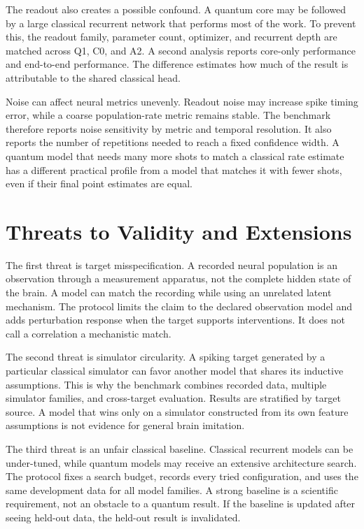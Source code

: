 \documentclass[conference]{IEEEtran}
\begin{document}
The readout also creates a possible confound. A quantum core may be followed by a large
classical recurrent network that performs most of the work. To prevent this, the readout
family, parameter count, optimizer, and recurrent depth are matched across Q1, C0, and
A2. A second analysis reports core-only performance and end-to-end performance. The
difference estimates how much of the result is attributable to the shared classical
head.

Noise can affect neural metrics unevenly. Readout noise may increase spike timing error,
while a coarse population-rate metric remains stable. The benchmark therefore reports
noise sensitivity by metric and temporal resolution. It also reports the number of
repetitions needed to reach a fixed confidence width. A quantum model that needs many
more shots to match a classical rate estimate has a different practical profile from a
model that matches it with fewer shots, even if their final point estimates are equal.

\section{Threats to Validity and Extensions}
\label{sec:threats}

The first threat is target misspecification. A recorded neural population is an
observation through a measurement apparatus, not the complete hidden state of the brain.
A model can match the recording while using an unrelated latent mechanism. The protocol
limits the claim to the declared observation model and adds perturbation response when
the target supports interventions. It does not call a correlation a mechanistic match.

The second threat is simulator circularity. A spiking target generated by a particular
classical simulator can favor another model that shares its inductive assumptions. This
is why the benchmark combines recorded data, multiple simulator families, and
cross-target evaluation. Results are stratified by target source. A model that wins only
on a simulator constructed from its own feature assumptions is not evidence for general
brain imitation.

The third threat is an unfair classical baseline. Classical recurrent models can be
under-tuned, while quantum models may receive an extensive architecture search. The
protocol fixes a search budget, records every tried configuration, and uses the same
development data for all model families. A strong baseline is a scientific requirement,
not an obstacle to a quantum result. If the baseline is updated after seeing held-out
data, the held-out result is invalidated.
\end{document}
